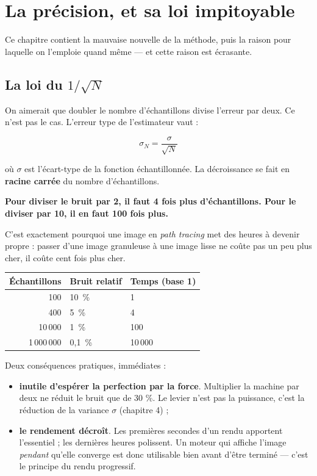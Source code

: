 \chapter{La précision, et sa loi impitoyable}

Ce chapitre contient la mauvaise nouvelle de la méthode, puis la raison pour
laquelle on l'emploie quand même — et cette raison est écrasante.

\section{La loi du $1/\sqrt{N}$}

On aimerait que doubler le nombre d'échantillons divise l'erreur par deux. Ce
n'est pas le cas. L'erreur type de l'estimateur vaut :

\[ \sigma_N = \frac{\sigma}{\sqrt{N}} \]

où $\sigma$ est l'écart-type de la fonction échantillonnée. La décroissance se
fait en \textbf{racine carrée} du nombre d'échantillons.

\begin{nkretenir}
\textbf{Pour diviser le bruit par 2, il faut 4 fois plus d'échantillons. Pour
le diviser par 10, il en faut 100 fois plus.}

C'est exactement pourquoi une image en \emph{path tracing} met des heures à
devenir propre : passer d'une image granuleuse à une image lisse ne coûte pas
un peu plus cher, il coûte cent fois plus cher.
\end{nkretenir}

\begin{center}
\begin{tabular}{@{}rll@{}}
\toprule
\textbf{Échantillons} & \textbf{Bruit relatif} & \textbf{Temps (base 1)} \\
\midrule
100        & 10~\%   & 1 \\
400        & 5~\%    & 4 \\
10\,000    & 1~\%    & 100 \\
1\,000\,000& 0,1~\%  & 10\,000 \\
\bottomrule
\end{tabular}
\end{center}

Deux conséquences pratiques, immédiates :

\begin{itemize}
  \item \textbf{inutile d'espérer la perfection par la force}. Multiplier la
        machine par deux ne réduit le bruit que de 30 \%. Le levier n'est pas
        la puissance, c'est la réduction de la variance $\sigma$ (chapitre 4) ;
  \item \textbf{le rendement décroît}. Les premières secondes d'un rendu
        apportent l'essentiel ; les dernières heures polissent. Un moteur qui
        affiche l'image \emph{pendant} qu'elle converge est donc utilisable
        bien avant d'être terminé — c'est le principe du rendu progressif.
\end{itemize}

